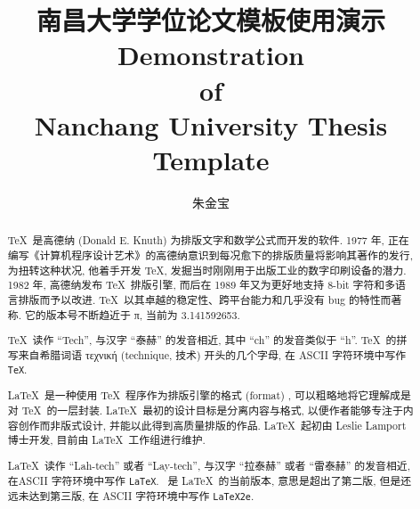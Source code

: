 \documentclass[final]{ncuthesis}
\title{南昌大学学位论文模板使用演示}
\title*{Demonstration\\of\\Nanchang University Thesis Template}
\author{朱金宝}
\begin{document}
\maketitle
\frontmatter
\makedecaut
\begin{abstract}
\TeX\ 是高德纳  (Donald E. Knuth) 为排版文字和数学公式而开发的软件. 1977 年, 正在编写《计算机程序设计艺术》的高德纳意识到每况愈下的排版质量将影响其著作的发行, 为扭转这种状况, 他着手开发 \TeX, 发掘当时刚刚用于出版工业的数字印刷设备的潜力. 1982 年, 高德纳发布 \TeX\ 排版引擎, 而后在 1989 年又为更好地支持 8-bit 字符和多语言排版而予以改进. \TeX\ 以其卓越的稳定性、跨平台能力和几乎没有 bug 的特性而著称. 它的版本号不断趋近于 π, 当前为 3.141592653. 

\TeX\ 读作 ``Tech'', 与汉字 ``泰赫'' 的发音相近, 其中 ``ch'' 的发音类似于 ``h''. \TeX\ 的拼写来自希腊词语 τεχνική (technique, 技术) 开头的几个字母, 在 ASCII 字符环境中写作 \texttt{TeX}. 

\LaTeX\ 是一种使用 \TeX\ 程序作为排版引擎的格式 (format) , 可以粗略地将它理解成是对 \TeX\ 的一层封装. \LaTeX\ 最初的设计目标是分离内容与格式, 以便作者能够专注于内容创作而非版式设计, 并能以此得到高质量排版的作品. \LaTeX\ 起初由 Leslie Lamport 博士开发, 目前由 \LaTeX\ 工作组进行维护. 

\LaTeX\ 读作 ``Lah-tech'' 或者 ``Lay-tech'', 与汉字 ``拉泰赫'' 或者 ``雷泰赫'' 的发音相近, 在ASCII 字符环境中写作 \texttt{LaTeX}. \LaTeXe\ 是 \LaTeX\ 的当前版本, 意思是超出了第二版, 但是还远未达到第三版, 在 ASCII 字符环境中写作 \texttt{LaTeX2e}. 
\end{abstract}
\end{document}
